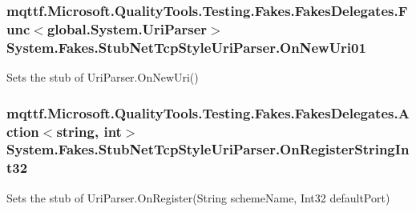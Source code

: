\hypertarget{class_system_1_1_fakes_1_1_stub_net_tcp_style_uri_parser_ae77d039990eae8256c6d2d2463613218}{
\subsubsection[{On\-New\-Uri01}]{\setlength{\rightskip}{0pt plus 5cm}mqttf.\-Microsoft.\-Quality\-Tools.\-Testing.\-Fakes.\-Fakes\-Delegates.\-Func$<$global.\-System.\-Uri\-Parser$>$ System.\-Fakes.\-Stub\-Net\-Tcp\-Style\-Uri\-Parser.\-On\-New\-Uri01}}\label{class_system_1_1_fakes_1_1_stub_net_tcp_style_uri_parser_ae77d039990eae8256c6d2d2463613218}


Sets the stub of Uri\-Parser.\-On\-New\-Uri()

\hypertarget{class_system_1_1_fakes_1_1_stub_net_tcp_style_uri_parser_aae9dae25bfebd6be86264db7868c4645}{
\subsubsection[{On\-Register\-String\-Int32}]{\setlength{\rightskip}{0pt plus 5cm}mqttf.\-Microsoft.\-Quality\-Tools.\-Testing.\-Fakes.\-Fakes\-Delegates.\-Action$<$string, int$>$ System.\-Fakes.\-Stub\-Net\-Tcp\-Style\-Uri\-Parser.\-On\-Register\-String\-Int32}}\label{class_system_1_1_fakes_1_1_stub_net_tcp_style_uri_parser_aae9dae25bfebd6be86264db7868c4645}


Sets the stub of Uri\-Parser.\-On\-Register(\-String scheme\-Name, Int32 default\-Port)

